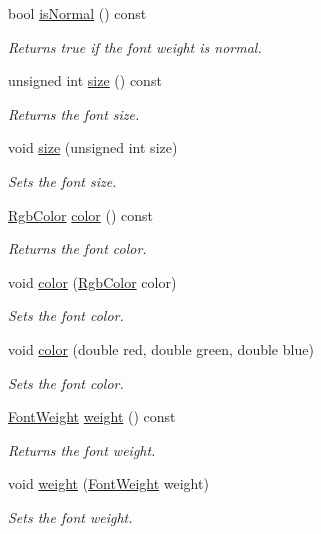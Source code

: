 \begin{CompactItemize}
bool \hyperlink{class_style_db2cbc7ca50b2f5c632c8e9b0420044c}{isNormal} () const 
\begin{CompactList}\small\item\em Returns true if the font weight is normal. \item\end{CompactList}\item 
unsigned int \hyperlink{class_style_73cb356fdfc022f51ff263b1c1faa9fd}{size} () const 
\begin{CompactList}\small\item\em Returns the font size. \item\end{CompactList}\item 
void \hyperlink{class_style_9ef3273bd0c0558d7203a87ac26cf4d2}{size} (unsigned int size)
\begin{CompactList}\small\item\em Sets the font size. \item\end{CompactList}\item 
\hyperlink{struct_rgb_color}{RgbColor} \hyperlink{class_style_71b938a521e8c6e30926ddb3d0aa83b3}{color} () const 
\begin{CompactList}\small\item\em Returns the font color. \item\end{CompactList}\item 
void \hyperlink{class_style_0f557c5b3ea0a3320dd71d476a004bac}{color} (\hyperlink{struct_rgb_color}{RgbColor} color)
\begin{CompactList}\small\item\em Sets the font color. \item\end{CompactList}\item 
void \hyperlink{class_style_a32d9527a9ce8b50eb8e7d128fce578f}{color} (double red, double green, double blue)
\begin{CompactList}\small\item\em Sets the font color. \item\end{CompactList}\item 
\hyperlink{_font_weight_8h_ecff23ba4a68486421bcea57e095fe66}{FontWeight} \hyperlink{class_style_9c2124b07762f0b72dea763ef01601ed}{weight} () const 
\begin{CompactList}\small\item\em Returns the font weight. \item\end{CompactList}\item 
void \hyperlink{class_style_f1273b59bdfe98b24410177f1eea7732}{weight} (\hyperlink{_font_weight_8h_ecff23ba4a68486421bcea57e095fe66}{FontWeight} weight)
\begin{CompactList}\small\item\em Sets the font weight. \item\end{CompactList}\end{CompactItemize}
